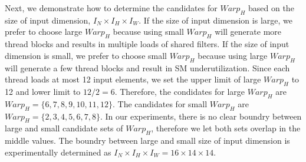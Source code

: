 Next, we demonstrate how to determine the candidates for $Warp_H$ based on the size of input dimension, $I_N \times I_H \times I_W$.
If the size of input dimension is large, we prefer to choose large $Warp_H$ because using small $Warp_H$ will generate more thread blocks and results in multiple loads of shared filters.
If the size of input dimension is small, we prefer to choose small $Warp_H$ because using large $Warp_H$ will generate a few thread blocks and result in SM underutilization.
Since each thread loads at most 12 input elements, we set the upper limit of large $Warp_H$ to 12 and lower limit to $12/2=6$. 
Therefore, the condidates for large $Warp_H$ are $Warp_H=\{6,7,8,9,10,11,12\}$.
The candidates for small $Warp_H$ are $Warp_H=\{2,3,4,5,6,7,8\}$.
In our experiments, there is no clear boundry between large and small candidate sets of $Warp_H$, therefore we let both sets overlap in the middle values.
The boundry between large and small size of input dimension is experimentally determined as $I_N \times I_H \times I_W=16 \times 14 \times 14$.

